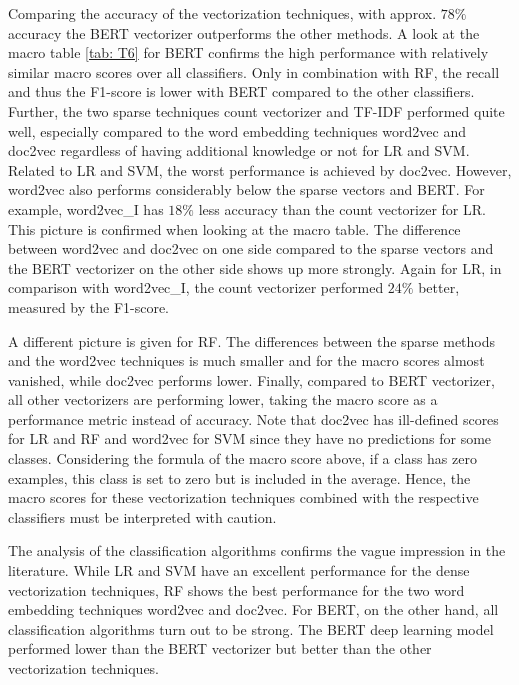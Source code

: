 \documentclass[12pt, a4paper, titlepage]{article}
\begin{document}
Comparing the accuracy of the vectorization techniques, with approx. $78\%$ accuracy the \ac{BERT} vectorizer outperforms the other methods. A look at the macro table \ref{tab: T6} for BERT confirms the high performance with relatively similar macro scores over all classifiers. Only in combination with \ac{RF}, the recall and thus the F1-score is lower with \ac{BERT} compared to the other classifiers. Further, the two sparse techniques count vectorizer and \ac{TF-IDF} performed quite well, especially compared to the word embedding techniques word2vec and doc2vec regardless of having additional knowledge or not for \ac{LR} and \ac{SVM}. Related to \ac{LR} and \ac{SVM}, the worst performance is achieved by doc2vec. However, word2vec also performs considerably below the sparse vectors and \ac{BERT}. For example, word2vec\_I has $18\%$ less accuracy than the count vectorizer for \ac{LR}. This picture is confirmed when looking at the macro table. The difference between word2vec and doc2vec on one side compared to the sparse vectors and the \ac{BERT} vectorizer on the other side shows up more strongly. Again for \ac{LR}, in comparison with word2vec\_I, the count vectorizer performed $24\%$ better, measured by the F1-score. 

A different picture is given for \ac{RF}. The differences between the sparse methods and the word2vec techniques is much smaller and for the macro scores almost vanished, while doc2vec performs lower. Finally, compared to \ac{BERT} vectorizer, all other vectorizers are performing lower, taking the macro score as a performance metric instead of accuracy. Note that doc2vec has ill-defined scores for \ac{LR} and \ac{RF} and word2vec for \ac{SVM} since they have no predictions for some classes. Considering the formula of the macro score above, if a class has zero examples, this class is set to zero but is included in the average. Hence, the macro scores for these vectorization techniques combined with the respective classifiers must be interpreted with caution. 

The analysis of the classification algorithms confirms the vague impression in the literature. While LR and SVM have an excellent performance for the dense vectorization techniques, RF shows the best performance for the two word embedding techniques word2vec and doc2vec. For BERT, on the other hand, all classification algorithms turn out to be strong. The BERT deep learning model performed lower than the BERT vectorizer but better than the other vectorization techniques. 
\end{document}
